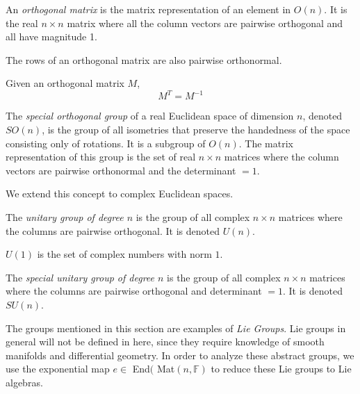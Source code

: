 \documentclass{article}
\begin{document}
    \begin{definition}
    An \textit{orthogonal matrix} is the matrix representation of an element in $O(n)$. It is the real $n \times n$ matrix where all the column vectors are pairwise orthogonal and all have magnitude 1. 
    \end{definition}

    \begin{proposition}
    The rows of an orthogonal matrix are also pairwise orthonormal.
    \end{proposition}

    \begin{proposition}
    Given an orthogonal matrix $M$,
    \[M^T = M^{-1}\]
    \end{proposition}

    \begin{definition}
    The \textit{special orthogonal group} of a real Euclidean space of dimension $n$, denoted $SO(n)$, is the group of all isometries that preserve the handedness of the space consisting only of rotations. It is a subgroup of $O(n)$. The matrix representation of this group is the set of real $n \times n$ matrices where the column vectors are pairwise orthonormal and the determinant $=1$. 
    \end{definition}

    We extend this concept to complex Euclidean spaces. 

    \begin{definition}
    The \textit{unitary group of degree $n$} is the group of all complex $n \times n$ matrices where the columns are pairwise orthogonal. It is denoted $U(n)$. 
    \end{definition}

    \begin{example}
    $U(1)$ is the set of complex numbers with norm $1$. 
    \end{example}

    \begin{definition}
    The \textit{special unitary group of degree $n$} is the group of all complex $n \times n$ matrices where the columns are pairwise orthogonal and determinant $=1$. It is denoted $SU(n)$. 
    \end{definition}

    The groups mentioned in this section are examples of \textit{Lie Groups}. Lie groups in general will not be defined in here, since they require knowledge of smooth manifolds and differential geometry. In order to analyze these abstract groups, we use the exponential map $e \in$ End$($ Mat$(n, \mathbb{F})$ to reduce these Lie groups to Lie algebras.
\end{document}
